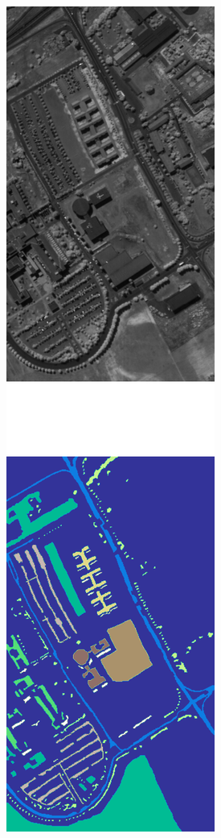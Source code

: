 \documentclass[parskip=full]{scrartcl}
\begin{document}
\begin{figure}[H]
\begin{subfigure}{.20\textwidth}
		\includegraphics[height=1.5\linewidth]{../analysis/pavia_university}
		\subcaption{{\medbreak}}\label{fig:pavia_university}
	\end{subfigure}


\end{figure}
\end{document}
